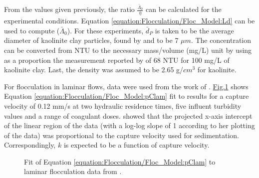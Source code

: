 \documentclass[letterpaper,10pt,english]{sphinxmanual}
\let\sphinxpxdimen\pdfpxdimen\else\newdimen\sphinxpxdimen
\begin{document}
From the values given previously, the ratio \(\frac{\bar \Lambda_0}{\bar{\eta}}\) can be calculated for the experimental conditions. Equation \eqref{equation:Flocculation/Floc_Model:Ld} can be used to compute (\(\bar \Lambda_0\)). For these experiments, \(\bar{d}_P\) is taken to be the average diameter of kaolinite clay particles, found by \label{\detokenize{Flocculation/Floc_Model:id15}}{\hyperref[\detokenize{Flocculation/Floc_Model:floc-model-wei-coagulation-2015}]{\sphinxcrossref{{[}WZL+15{]}}}} and \label{\detokenize{Flocculation/Floc_Model:id16}}{\hyperref[\detokenize{Flocculation/Floc_Model:floc-model-sun-characterization-2015}]{\sphinxcrossref{{[}SWSL15{]}}}} to be 7 \(\mu m\). The concentration can be converted from NTU to the necessary mass/volume (mg/L) unit by using as a proportion the measurement reported by \label{\detokenize{Flocculation/Floc_Model:id17}}{\hyperref[\detokenize{Flocculation/Floc_Model:floc-model-wei-coagulation-2015}]{\sphinxcrossref{{[}WZL+15{]}}}} of 68 NTU for 100 mg/L of kaolinite clay. Last, the density was assumed to be 2.65 g/\(cm^3\) for kaolinite.

For flocculation in laminar flows, data were used from the work of \label{\detokenize{Flocculation/Floc_Model:id18}}{\hyperref[\detokenize{Flocculation/Floc_Model:floc-model-swetland-flocculation-sedimentation-2014}]{\sphinxcrossref{{[}SWSL14{]}}}}. \hyperref[\detokenize{Flocculation/Floc_Model:figure-pennockfig5}]{Fig.\@ \ref{\detokenize{Flocculation/Floc_Model:figure-pennockfig5}}} shows Equation \eqref{equation:Flocculation/Floc_Model:pClam} fit to results for a capture velocity of 0.12 mm/s at two hydraulic residence times, five influent turbidity values and a range of coagulant doses. \label{\detokenize{Flocculation/Floc_Model:id19}}{\hyperref[\detokenize{Flocculation/Floc_Model:floc-model-swetland-flocculation-sedimentation-2014}]{\sphinxcrossref{{[}SWSL14{]}}}} showed that the projected x-axis intercept of the linear region of the data (with a log-log slope of 1 according to her plotting of the data) was proportional to the capture velocity used for sedimentation. Correspondingly, \(k\) is expected to be a function of capture velocity.

\begin{figure}[htbp]
\centering
\capstart

\noindent\sphinxincludegraphics[width=400\sphinxpxdimen]{{PennockFig5}.png}
\caption{Fit of Equation \eqref{equation:Flocculation/Floc_Model:pClam} to laminar flocculation data from \label{\detokenize{Flocculation/Floc_Model:id20}}{\hyperref[\detokenize{Flocculation/Floc_Model:floc-model-swetland-flocculation-sedimentation-2014}]{\sphinxcrossref{{[}SWSL14{]}}}}.}\label{\detokenize{Flocculation/Floc_Model:id41}}\label{\detokenize{Flocculation/Floc_Model:figure-pennockfig5}}\end{figure}
\end{document}
